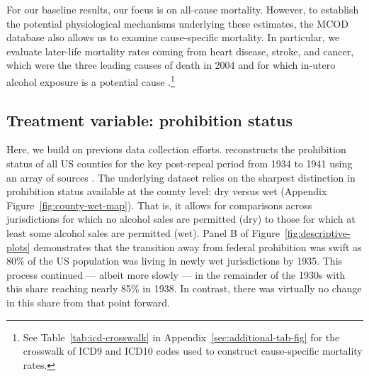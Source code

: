 \documentclass[12pt]{article}
\begin{document}
For our baseline results, our focus is on all-cause mortality. 
However, to establish the potential physiological mechanisms underlying these estimates, the MCOD database also allows us to examine cause-specific mortality. 
In particular, we evaluate later-life mortality rates coming from heart disease, stroke, and cancer, which were the three leading causes of death in 2004  and for which in-utero alcohol exposure is a potential cause .\footnote{See Table~\ref{tab:icd-crosswalk} in Appendix~\ref{sec:additional-tab-fig} for the crosswalk of ICD9 and ICD10 codes used to construct cause-specific mortality rates.}

\subsection{Treatment variable: prohibition status}\label{sec:data-prohibition-status}

Here, we build on previous data collection efforts.  reconstructs the prohibition status of all US counties for the key post-repeal period from 1934 to 1941 using an array of sources . 
The underlying dataset relies on the sharpest distinction in prohibition status available at the county level: dry versus wet (Appendix Figure~\ref{fig:county-wet-map}). That is, it allows for comparisons across jurisdictions for which no alcohol sales are permitted (dry) to those for which at least some alcohol sales are permitted (wet). 
Panel B of Figure~\ref{fig:descriptive-plots} demonstrates that the transition away from federal prohibition was swift as 80\% of the US population was living in newly wet jurisdictions by 1935. 
This process continued — albeit more slowly — in the remainder of the 1930s with this share reaching nearly 85\% in 1938. 
In contrast, there was virtually no change in this share from that point forward. 
\end{document}
